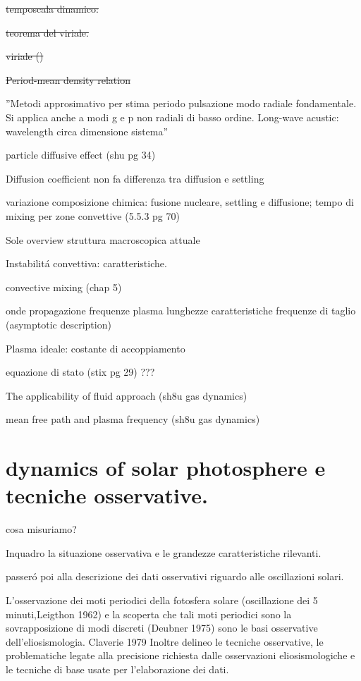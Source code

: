 \begin{itemize*}
\item \sout{temposcala dinamico:}
\item \sout{teorema del viriale.}
\item \sout{viriale (\cite{han12stellar})}
\item \sout{Period-mean density relation}
\item ''Metodi approsimativo per stima periodo pulsazione modo radiale fondamentale. Si applica anche a modi g e p non radiali di basso ordine. Long-wave acustic: wavelength circa dimensione sistema''

\item particle diffusive effect (shu pg 34)
\item Diffusion coefficient non fa differenza tra diffusion e settling
\item variazione composizione chimica: fusione nucleare, settling e diffusione; tempo di mixing per zone convettive (5.5.3 pg 70)
\item Sole overview struttura macroscopica attuale
\item Instabilit\'a convettiva: caratteristiche.
\item convective mixing (chap 5)
\item onde propagazione frequenze plasma lunghezze caratteristiche frequenze di taglio (asymptotic description)
\item Plasma ideale: costante di accoppiamento
\item equazione di stato (stix pg 29) ???
\item The applicability of fluid approach (sh8u gas dynamics)
\item mean free path and plasma frequency (sh8u gas dynamics)
\end{itemize*}

\printbibliography[heading=subbibintoc]


\section{dynamics of solar photosphere e tecniche osservative.}

cosa misuriamo?

Inquadro la situazione osservativa e le grandezze caratteristiche rilevanti.

passer\'o poi alla descrizione dei dati osservativi riguardo alle oscillazioni solari.

L'osservazione dei moti periodici della fotosfera solare (oscillazione dei 5 minuti,Leigthon 1962) e la scoperta che tali moti periodici sono la sovrapposizione di modi discreti (Deubner 1975) sono le basi osservative dell'eliosismologia. Claverie 1979
Inoltre delineo le tecniche osservative, le problematiche legate alla precisione richiesta dalle osservazioni eliosismologiche e le tecniche di base usate per l'elaborazione dei dati.
 
